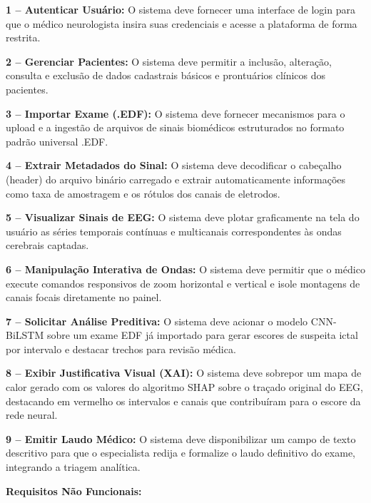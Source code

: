 \noindent \textbf{1 – Autenticar Usuário:} O sistema deve fornecer uma interface de login para que o médico neurologista insira suas credenciais e acesse a plataforma de forma restrita.\par
\noindent \textbf{2 – Gerenciar Pacientes:} O sistema deve permitir a inclusão, alteração, consulta e exclusão de dados cadastrais básicos e prontuários clínicos dos pacientes.\par
\noindent \textbf{3 – Importar Exame (.EDF):} O sistema deve fornecer mecanismos para o upload e a ingestão de arquivos de sinais biomédicos estruturados no formato padrão universal .EDF.\par
\noindent \textbf{4 – Extrair Metadados do Sinal:} O sistema deve decodificar o cabeçalho (header) do arquivo binário carregado e extrair automaticamente informações como taxa de amostragem e os rótulos dos canais de eletrodos.\par
\noindent \textbf{5 – Visualizar Sinais de EEG:} O sistema deve plotar graficamente na tela do usuário as séries temporais contínuas e multicanais correspondentes às ondas cerebrais captadas.\par
\noindent \textbf{6 – Manipulação Interativa de Ondas:} O sistema deve permitir que o médico execute comandos responsivos de zoom horizontal e vertical e isole montagens de canais focais diretamente no painel.\par
\noindent \textbf{7 – Solicitar Análise Preditiva: }O sistema deve acionar o modelo CNN-BiLSTM sobre um exame EDF já importado para gerar escores de suspeita ictal por intervalo e destacar trechos para revisão médica.\par
\noindent \textbf{8 – Exibir Justificativa Visual (XAI): }O sistema deve sobrepor um mapa de calor gerado com os valores do algoritmo SHAP sobre o traçado original do EEG, destacando em vermelho os intervalos e canais que contribuíram para o escore da rede neural.\par
\noindent \textbf{9 – Emitir Laudo Médico:} O sistema deve disponibilizar um campo de texto descritivo para que o especialista redija e formalize o laudo definitivo do exame, integrando a triagem analítica.\par
\textbf{Requisitos Não Funcionais:}

